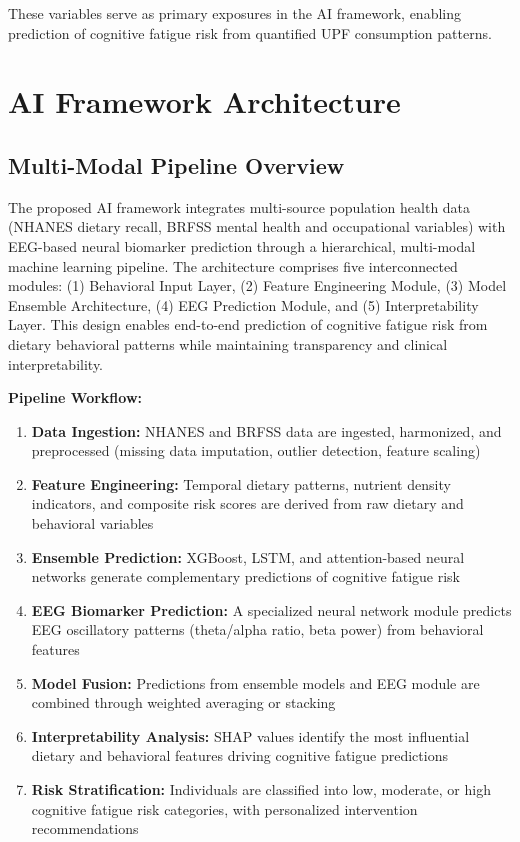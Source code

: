 \documentclass[journal,twoside,10pt]{IEEEtran}
\begin{document}
These variables serve as primary exposures in the AI framework, enabling prediction of cognitive fatigue risk from quantified UPF consumption patterns.



\section{AI Framework Architecture}

\subsection{Multi-Modal Pipeline Overview}

The proposed AI framework integrates multi-source population health data (NHANES dietary recall, BRFSS mental health and occupational variables) with EEG-based neural biomarker prediction through a hierarchical, multi-modal machine learning pipeline. The architecture comprises five interconnected modules: (1) Behavioral Input Layer, (2) Feature Engineering Module, (3) Model Ensemble Architecture, (4) EEG Prediction Module, and (5) Interpretability Layer. This design enables end-to-end prediction of cognitive fatigue risk from dietary behavioral patterns while maintaining transparency and clinical interpretability.

\textbf{Pipeline Workflow:}
\begin{enumerate}
\item \textbf{Data Ingestion:} NHANES and BRFSS data are ingested, harmonized, and preprocessed (missing data imputation, outlier detection, feature scaling)
\item \textbf{Feature Engineering:} Temporal dietary patterns, nutrient density indicators, and composite risk scores are derived from raw dietary and behavioral variables
\item \textbf{Ensemble Prediction:} XGBoost, LSTM, and attention-based neural networks generate complementary predictions of cognitive fatigue risk
\item \textbf{EEG Biomarker Prediction:} A specialized neural network module predicts EEG oscillatory patterns (theta/alpha ratio, beta power) from behavioral features
\item \textbf{Model Fusion:} Predictions from ensemble models and EEG module are combined through weighted averaging or stacking
\item \textbf{Interpretability Analysis:} SHAP values identify the most influential dietary and behavioral features driving cognitive fatigue predictions
\item \textbf{Risk Stratification:} Individuals are classified into low, moderate, or high cognitive fatigue risk categories, with personalized intervention recommendations
\end{enumerate}
\end{document}
